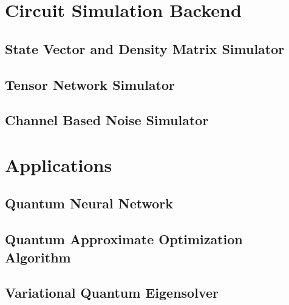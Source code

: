 \documentclass[pra,twocolumn,superscriptaddress,floatfix,nofootinbib,amsmath,amssymb]{revtex4-1}
\begin{document}
\section{Circuit Simulation Backend}

\subsection{State Vector and Density Matrix Simulator}


\subsection{Tensor Network Simulator}


\subsection{Channel Based Noise Simulator}



\section{Applications}
\label{sec:applications}
\subsection{Quantum Neural Network}








\subsection{Quantum Approximate Optimization Algorithm}


\subsection{Variational Quantum Eigensolver}

\end{document}

